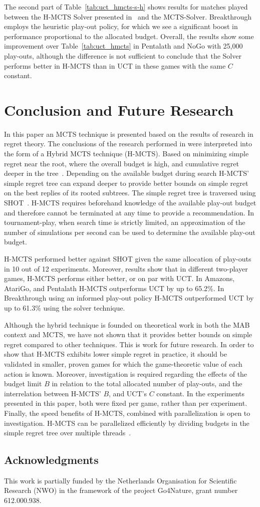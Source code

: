 \documentclass[a4paper]{llncs}
\begin{document}
The second part of Table~\ref{tab:uct_hmcts-s-h} shows results for matches played between the H-MCTS Solver presented in~\cite{pepels14novel} and the MCTS-Solver. Breakthrough employs the heuristic play-out policy, for which we see a significant boost in performance proportional to the allocated budget. Overall, the results show some improvement over Table~\ref{tab:uct_hmcts} in Pentalath and NoGo with 25,000 play-outs, although the difference is not sufficient to conclude that the Solver performs better in H-MCTS than in UCT in these games with the same $C$ constant.

\section{Conclusion and Future Research}
\label{sec:concl}
In this paper an MCTS technique is presented based on the results of research in regret theory. The conclusions of the research performed in \cite{Bubeck11Pure} were interpreted into the form of a Hybrid MCTS technique (H-MCTS). Based on minimizing simple regret near the root, where the overall budget is high, and cumulative regret deeper in the tree~\cite{tolpin2012mcts}. Depending on the available budget during search H-MCTS' simple regret tree can expand deeper to provide  better bounds on simple regret on the best replies of its rooted subtrees. The simple regret tree is traversed using SHOT~\cite{Cazenave14SHOT}. H-MCTS requires beforehand knowledge of the available play-out budget and therefore cannot be terminated at any time to provide a recommendation. In tournament-play, when search time is strictly limited, an approximation of the number of simulations per second can be used to determine the available play-out budget.

H-MCTS performed better against SHOT given the same allocation of play-outs in 10 out of 12 experiments. Moreover, results show that in different two-player games, H-MCTS performs either better, or on par with UCT. In Amazons, AtariGo, and Pentalath H-MCTS outperforms UCT by up to 65.2\%. In Breakthrough using an informed play-out policy H-MCTS outperformed UCT by up to 61.3\% using the solver technique.

Although the hybrid technique is founded on theoretical work in both the MAB context and MCTS, we have not shown that it provides better bounds on simple regret compared to other techniques. This is work for future research. In order to show that H-MCTS exhibits lower simple regret in practice, it should be validated in smaller, proven games for which the game-theoretic value of each action is known. Moreover, investigation is required regarding the effects of the budget limit $B$ in relation to the total allocated number of play-outs, and the interrelation between H-MCTS' $B$, and UCT's $C$ constant. In the experiments presented in this paper, both were fixed per game, rather than per experiment. Finally, the speed benefits of H-MCTS, combined with parallelization is open to investigation. H-MCTS can be parallelized efficiently by dividing budgets in the simple regret tree over multiple threads~\cite{Cazenave14SHOT}.

\subsection*{Acknowledgments} 
This work is partially funded by the Netherlands Organisation for Scientific Research (NWO) in the framework of the project Go4Nature, grant number 612.000.938.



\end{document}
